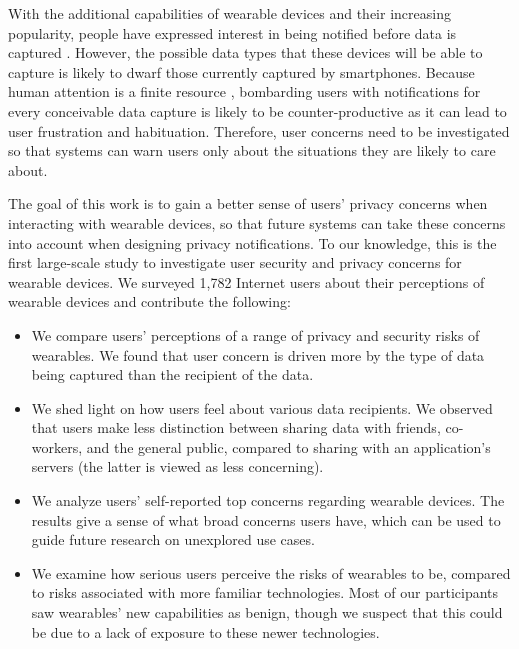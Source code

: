 With the additional capabilities of wearable devices and their increasing popularity, people have expressed interest in being notified before data is captured \cite{denning2014situ}. However, the possible data types that these devices will be able to capture is likely to dwarf those currently captured by smartphones. Because human attention is a finite resource \cite{bohme2011security}, bombarding users with notifications for every conceivable data capture is likely to be counter-productive as it can lead to user frustration and habituation. Therefore, user concerns need to be investigated so that systems can warn users only about the situations they are likely to care about.

The goal of this work is to gain a better sense of users' privacy concerns when interacting with wearable devices, so that future systems can take these concerns into account when designing privacy notifications. To our knowledge, this is the first large-scale study to investigate user security and privacy concerns for wearable devices. We surveyed 1,782 Internet users about their perceptions of wearable devices and contribute the following: %

\begin{itemize} \itemsep1pt \parskip0pt 
\item We compare users' perceptions of a range of privacy and security risks of wearables. We found that user concern is driven more by the type of data being captured than the recipient of the data.
\item We shed light on how users feel about various data recipients. We observed that users make less distinction between sharing data with friends, co-workers, and the general public, compared to sharing with an application's servers (the latter is viewed as less concerning).
\item We analyze users' self-reported top concerns regarding wearable devices. The results give a sense of what broad concerns users have, which can be used to guide future research on unexplored use cases. 
\item We examine how serious users perceive the risks of wearables to be, compared to risks associated with more familiar technologies. Most of our participants saw wearables' new capabilities as benign, though we suspect that this could be due to a lack of exposure to these newer technologies.
\end{itemize}
